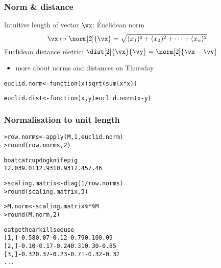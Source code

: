 \begin{frame}[fragile]
  \frametitle{Norm \& distance}

Intuitive length of vector $\vx$: \h{Euclidean norm}
\[
\vx \mapsto \norm[2]{\vx} = \sqrt{
  (x_1)^2 + (x_2)^2 + \dots + (x_n)^2 }
\]
Euclidean distance \h{metric}: $\dist[2]{\vx}{\vy} = \norm[2]{\vx - \vy}$
\begin{itemize}
\item[\hand] more about norms and distances on Thursday
\end{itemize}

\gap
\begin{alltt}\small
{}

euclid.norm <- function (x) sqrt(sum(x * x))

euclid.dist <- function (x, y) euclid.norm(x - y)
\end{alltt}
\end{frame}

\begin{frame}[fragile]
  \frametitle{Normalisation to unit length}

\ungap
\begin{alltt}\small
{}
> row.norms <- apply(M, 1, euclid.norm) 
> round(row.norms, 2) \begin{Rout}
 boat   cat   cup   dog knife   pig 
12.03  9.01 12.93 10.93 17.45  7.46 \end{Rout}

> scaling.matrix <- diag(1 / row.norms)
> round(scaling.matrix, 3)

> M.norm <- scaling.matrix \%*\% M
> round(M.norm, 2) \begin{Rout}
         eat   get  hear  kill   see   use
  [1,] -0.58  0.07 -0.12 -0.79  0.10  0.09
  [2,] -0.10 -0.17 -0.24  0.31  0.30 -0.85
  [3,] -0.32  0.37 -0.23 -0.71 -0.32 -0.32
  ...
\end{Rout}
\end{alltt}
\end{frame}

